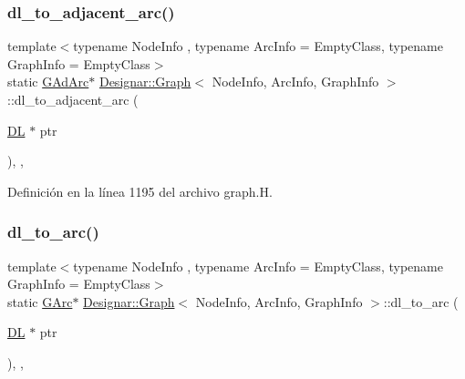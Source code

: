 \mbox{\label{class_designar_1_1_graph_afb508b7f8616948cc46c33deddcfaa4c}} 
\subsubsection{\texorpdfstring{dl\+\_\+to\+\_\+adjacent\+\_\+arc()}{dl\_to\_adjacent\_arc()}}
{\footnotesize\ttfamily template$<$typename Node\+Info , typename Arc\+Info  = Empty\+Class, typename Graph\+Info  = Empty\+Class$>$ \\
static \hyperlink{class_designar_1_1_graph_a7d00558995946c5653522148b54971bc}{G\+Ad\+Arc}$\ast$ \hyperlink{class_designar_1_1_graph}{Designar\+::\+Graph}$<$ Node\+Info, Arc\+Info, Graph\+Info $>$\+::dl\+\_\+to\+\_\+adjacent\+\_\+arc (\begin{DoxyParamCaption}\item[{\hyperlink{class_designar_1_1_d_l}{DL} $\ast$}]{ptr }\end{DoxyParamCaption})\hspace{0.3cm}{\ttfamily [inline]}, {\ttfamily [static]}, {\ttfamily [protected]}}



Definición en la línea 1195 del archivo graph.\+H.

\mbox{\label{class_designar_1_1_graph_a543b3279c059a0ee596a56a704ab7825}} 
\subsubsection{\texorpdfstring{dl\+\_\+to\+\_\+arc()}{dl\_to\_arc()}}
{\footnotesize\ttfamily template$<$typename Node\+Info , typename Arc\+Info  = Empty\+Class, typename Graph\+Info  = Empty\+Class$>$ \\
static \hyperlink{class_designar_1_1_graph_a5ad9e18b71899c2d4979426e367e5573}{G\+Arc}$\ast$ \hyperlink{class_designar_1_1_graph}{Designar\+::\+Graph}$<$ Node\+Info, Arc\+Info, Graph\+Info $>$\+::dl\+\_\+to\+\_\+arc (\begin{DoxyParamCaption}\item[{\hyperlink{class_designar_1_1_d_l}{DL} $\ast$}]{ptr }\end{DoxyParamCaption})\hspace{0.3cm}{\ttfamily [inline]}, {\ttfamily [static]}, {\ttfamily [protected]}}



